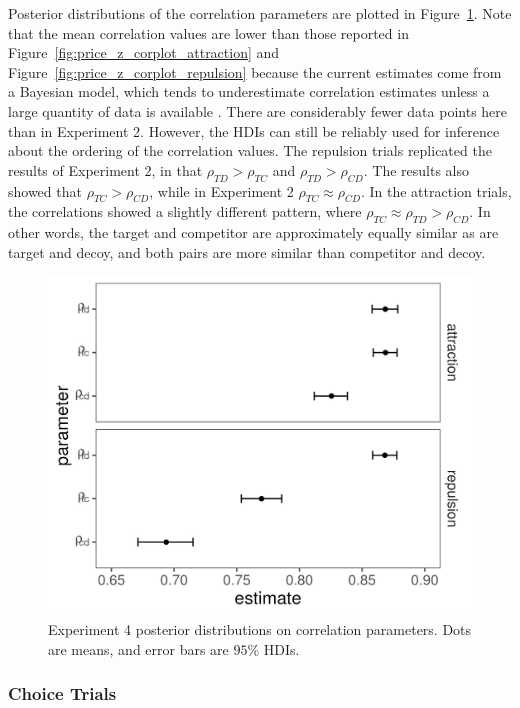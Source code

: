 Posterior distributions of the correlation parameters are plotted in Figure~\ref{fig:price_omega}. Note that the mean correlation values are lower than those reported in Figure~\ref{fig:price_z_corplot_attraction} and Figure~\ref{fig:price_z_corplot_repulsion} because the current estimates come from a Bayesian model, which tends to underestimate correlation estimates unless a large quantity of data is available \parencite{merkle2023opaque,martin2021}. There are considerably fewer data points here than in Experiment 2. However, the HDIs can still be reliably used for inference about the ordering of the correlation values. The repulsion trials replicated the results of Experiment 2, in that $\rho_{TD}>\rho_{TC}$ and $\rho_{TD}>\rho_{CD}$. The results also showed that $\rho_{TC}>\rho_{CD}$, while in Experiment 2 $\rho_{TC}\approx\rho_{CD}$. In the attraction trials, the correlations showed a slightly different pattern, where $\rho_{TC}\approx\rho_{TD}>\rho_{CD}$. In other words, the target and competitor are approximately equally similar as are target and decoy, and both pairs are more similar than competitor and decoy. 

\begin{figure}
    \centering
    \includegraphics[scale=.5,width=120mm]{figures/price_omega_posteriors.jpeg}
    \caption{Experiment 4 posterior distributions on correlation parameters. Dots are means, and error bars are $95\%$ HDIs.}
    \label{fig:price_omega}
\end{figure}

\subsubsection{Choice Trials}

